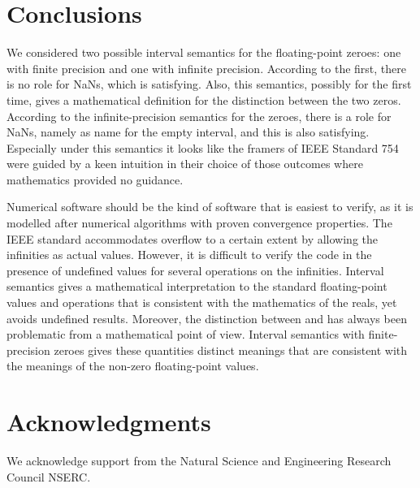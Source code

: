 \documentclass[11pt]{article}
\begin{document}
\section{Conclusions}

We considered two possible interval semantics for the floating-point
zeroes: one with finite precision and one with infinite precision.
According to the first, there is no role for NaNs, which is
satisfying. Also, this semantics, possibly for the first time, gives a
mathematical definition for the distinction between the two
zeros. According to the infinite-precision semantics for the zeroes,
there is a role for NaNs, namely as name for the empty interval, and
this is also satisfying. Especially under this semantics it looks like
the framers of IEEE Standard 754 were guided by a keen intuition in
their choice of those outcomes where mathematics provided no guidance.
  
Numerical software should be the kind of software that is easiest to
verify, as it is modelled after numerical algorithms with proven
convergence properties. The IEEE standard accommodates overflow to a
certain extent by allowing the infinities as actual values. However,
it is difficult to verify the code in the presence of undefined values
for several operations on the infinities. Interval semantics gives a
mathematical interpretation to the standard floating-point values and
operations that is consistent with the mathematics of the reals, yet
avoids undefined results. Moreover, the distinction between  and
 has always been problematic from a mathematical point of
view. Interval semantics with finite-precision zeroes gives these
quantities distinct meanings that are consistent with the meanings of
the non-zero floating-point values.

\section{Acknowledgments}
We acknowledge support from the Natural Science and
Engineering Research Council NSERC.
\end{document}
